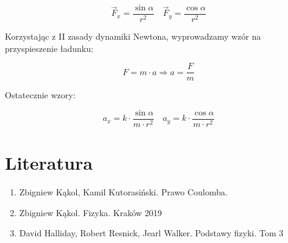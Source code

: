 \documentclass{article}
\begin{document}
$$
\vec{F}_{x}=\frac{\sin \alpha}{r^{2}} \quad \vec{F}_{y}=\frac{\cos \alpha}{r^{2}}
$$

\noindent Korzystając z II zasady dynamiki Newtona, wyprowadzamy wzór na przyspieszenie ładunku:

$$
F=m \cdot a \Rightarrow a=\frac{F}{m}
$$

\noindent Ostatecznie wzory:

$$
a_{x}=k \cdot \frac{\sin \alpha}{m \cdot r^{2}} \quad a_{y}=k \cdot \frac{\cos \alpha}{m \cdot r^{2}}
$$

\section{Literatura}
\begin{enumerate}
    \item Zbigniew Kąkol, Kamil Kutorasiński. Prawo Coulomba. 
    \item Zbigniew Kąkol. Fizyka. Kraków 2019
    \item David Halliday, Robert Resnick, Jearl Walker. Podstawy fizyki. Tom 3
\end{enumerate}
\end{document}
